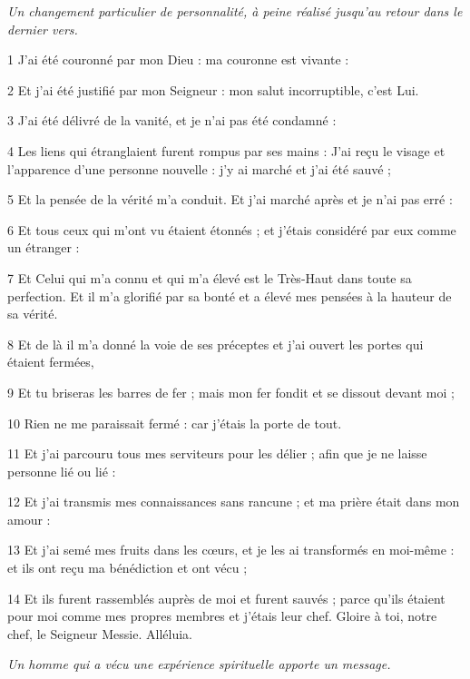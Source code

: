 
\par \textit{Un changement particulier de personnalité, à peine réalisé jusqu'au retour dans le dernier vers.}

\par 1 J'ai été couronné par mon Dieu : ma couronne est vivante :
\par 2 Et j'ai été justifié par mon Seigneur : mon salut incorruptible, c'est Lui.
\par 3 J'ai été délivré de la vanité, et je n'ai pas été condamné :
\par 4 Les liens qui étranglaient furent rompus par ses mains : J'ai reçu le visage et l'apparence d'une personne nouvelle : j'y ai marché et j'ai été sauvé ;
\par 5 Et la pensée de la vérité m'a conduit. Et j'ai marché après et je n'ai pas erré :
\par 6 Et tous ceux qui m'ont vu étaient étonnés ; et j'étais considéré par eux comme un étranger :
\par 7 Et Celui qui m'a connu et qui m'a élevé est le Très-Haut dans toute sa perfection. Et il m'a glorifié par sa bonté et a élevé mes pensées à la hauteur de sa vérité.
\par 8 Et de là il m'a donné la voie de ses préceptes et j'ai ouvert les portes qui étaient fermées,
\par 9 Et tu briseras les barres de fer ; mais mon fer fondit et se dissout devant moi ;
\par 10 Rien ne me paraissait fermé : car j'étais la porte de tout.
\par 11 Et j'ai parcouru tous mes serviteurs pour les délier ; afin que je ne laisse personne lié ou lié :
\par 12 Et j'ai transmis mes connaissances sans rancune ; et ma prière était dans mon amour :
\par 13 Et j'ai semé mes fruits dans les cœurs, et je les ai transformés en moi-même : et ils ont reçu ma bénédiction et ont vécu ;
\par 14 Et ils furent rassemblés auprès de moi et furent sauvés ; parce qu'ils étaient pour moi comme mes propres membres et j'étais leur chef. Gloire à toi, notre chef, le Seigneur Messie. Alléluia.


\par \textit{Un homme qui a vécu une expérience spirituelle apporte un message.}

